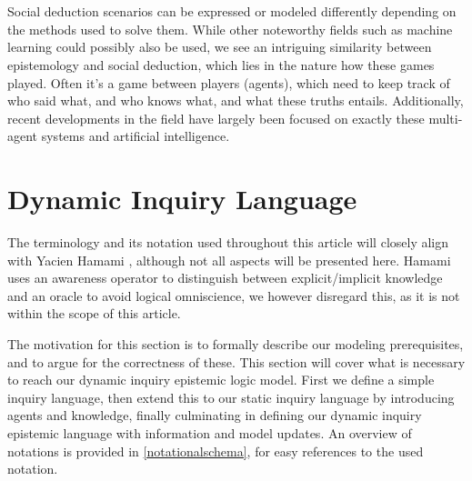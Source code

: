 \\\\

Social deduction scenarios can be expressed or modeled differently depending on
the methods used to solve them. While other noteworthy fields such as machine
learning could possibly also be used, we see an intriguing similarity between
epistemology and social deduction, which lies in the nature how these games
played. Often it's a game between players (agents), which need to keep track of
who said what, and who knows what, and what these truths entails. Additionally,
recent developments in the field have largely been focused on exactly these
multi-agent systems and artificial intelligence.

\section{Dynamic Inquiry Language}
The terminology and its notation used throughout this article will closely
align with Yacien Hamami \cite{delimi}, although not all aspects will be
presented here. Hamami uses an awareness operator to distinguish between
explicit/implicit knowledge and an oracle to avoid logical omniscience, we
however disregard this, as it is not within the scope of this article.

The motivation for this section is to formally describe our modeling
prerequisites, and to argue for the correctness of these. This section will
cover what is necessary to reach our dynamic inquiry epistemic logic model.
First we define a simple inquiry language, then extend this to our static
inquiry language by introducing agents and knowledge, finally culminating in
defining our dynamic inquiry epistemic language with information and model
updates. An overview of notations is provided in \cref{notationalschema}, for
easy references to the used notation.

\newpage


